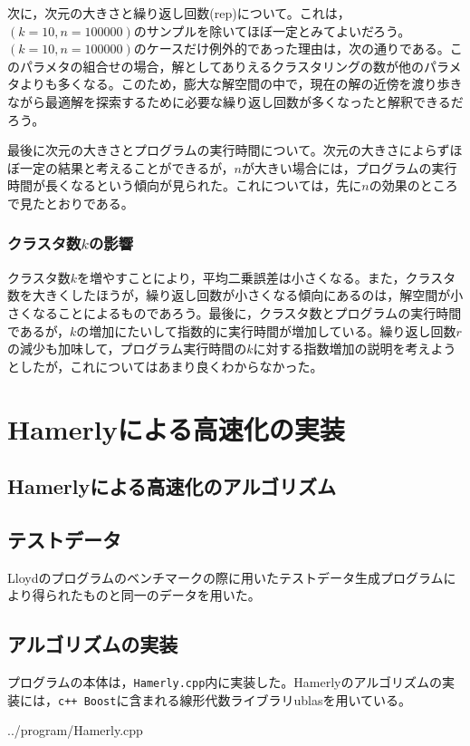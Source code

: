 \documentclass[10pt,a4,uplatex]{jsarticle}
\begin{document}
次に，次元の大きさと繰り返し回数(rep)について。これは，$(k = 10, n = 100000)$のサンプルを除いてほぼ一定とみてよいだろう。$(k = 10, n = 100000)$のケースだけ例外的であった理由は，次の通りである。このパラメタの組合せの場合，解としてありえるクラスタリングの数が他のパラメタよりも多くなる。このため，膨大な解空間の中で，現在の解の近傍を渡り歩きながら最適解を探索するために必要な繰り返し回数が多くなったと解釈できるだろう。

最後に次元の大きさとプログラムの実行時間について。次元の大きさによらずほぼ一定の結果と考えることができるが，$n$が大きい場合には，プログラムの実行時間が長くなるという傾向が見られた。これについては，先に$n$の効果のところで見たとおりである。

\subsubsection{クラスタ数$k$の影響}
クラスタ数$k$を増やすことにより，平均二乗誤差は小さくなる。また，クラスタ数を大きくしたほうが，繰り返し回数が小さくなる傾向にあるのは，解空間が小さくなることによるものであろう。最後に，クラスタ数とプログラムの実行時間であるが，$k$の増加にたいして指数的に実行時間が増加している。繰り返し回数$r$の減少も加味して，プログラム実行時間の$k$に対する指数増加の説明を考えようとしたが，これについてはあまり良くわからなかった。

\section{Hamerlyによる高速化の実装}
\subsection{Hamerlyによる高速化のアルゴリズム}


\subsection{テストデータ}
Lloydのプログラムのベンチマークの際に用いたテストデータ生成プログラムにより得られたものと同一のデータを用いた。

\subsection{アルゴリズムの実装}
プログラムの本体は，\verb+Hamerly.cpp+内に実装した。Hamerlyのアルゴリズムの実装には，\verb:c++ Boost:に含まれる線形代数ライブラリublasを用いている。

{../program/Hamerly.cpp}
\end{document}
